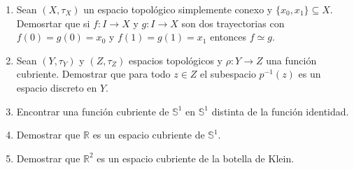 \documentclass[12pt]{report}
\numberwithin{section}{chapter}
\newcommand{\R}{\mathbb R}
\newcommand{\s}{\mathbb S}
\begin{document}
\begin{enumerate}
\item Sean $(X, \tau_X)$ un espacio topológico simplemente conexo y $\{x_0,x_1\} \subseteq X$. Demosrtar que si $f: I \to X$ y $g: I \to X$ son dos trayectorias con $f(0)=g(0)=x_0$ y $f(1)=g(1)=x_1$ entonces $f\simeq g$.

\item Sean $(Y,\tau_Y)$ y $(Z, \tau_Z)$ espacios topológicos y $\rho: Y \to Z$ una función cubriente. Demostrar que para todo $z\in Z$ el subespacio $p^{-1}(z)$ es un espacio discreto en $Y$.

\item Encontrar una función cubriente de $\s^1$ en $\s^1$ distinta de la función identidad.

\item Demostrar que $\R$ es un espacio cubriente de $\s^1$.

\item Demostrar que $\R^2$ es un espacio cubriente de la botella de Klein.

\end{enumerate}
\end{document}
